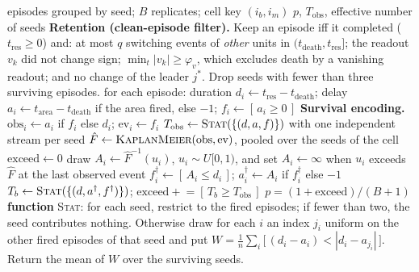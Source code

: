 \documentclass[11pt]{article}
\theoremstyle{definition}
\theoremstyle{remark}
\begin{document}
\begin{algorithm}[t]
\caption{Truncated calibrated null for the area-delay statistic.}
\label{alg:nulo}
\begin{algorithmic}[1]
\REQUIRE episodes grouped by seed; $B$ replicates; cell key $(i_b,i_m)$
\ENSURE $p$, $T_{\mathrm{obs}}$, effective number of seeds
\STATE \textbf{Retention (clean-episode filter).} Keep an episode iff it
completed ($t_{\mathrm{res}}\ge0$) and: at most $q$ switching events of
\emph{other} units in $(t_{\mathrm{death}},t_{\mathrm{res}}]$; the readout $v_k$
did not change sign; $\min_t|v_k|\ge\varphi_v$, which excludes death by a
vanishing readout; and no change of the leader $j^\ast$. Drop seeds with fewer
than three surviving episodes.
\STATE for each episode: duration $d_i\leftarrow t_{\mathrm{res}}-t_{\mathrm{death}}$;
       delay $a_i\leftarrow t_{\mathrm{area}}-t_{\mathrm{death}}$ if the area
       fired, else $-1$; \; $f_i\leftarrow[\,a_i\ge0\,]$
\STATE \textbf{Survival encoding.} $\mathrm{obs}_i\leftarrow a_i$ if $f_i$ else
       $d_i$; \; $\mathrm{ev}_i\leftarrow f_i$
\STATE $T_{\mathrm{obs}}\leftarrow\textsc{Stat}(\{(d,a,f)\})$ with one
       independent stream per seed
\STATE $\hat F\leftarrow\textsc{KaplanMeier}(\mathrm{obs},\mathrm{ev})$, pooled
       over the seeds of the cell
\STATE $\mathrm{exceed}\leftarrow0$
    \STATE draw $A_i\leftarrow\hat F^{-1}(u_i)$, $u_i\sim U[0,1)$, and set
           $A_i\leftarrow\infty$ when $u_i$ exceeds $\hat F$ at the last observed
           event 
    \STATE $f^\dagger_i\leftarrow[\,A_i\le d_i\,]$; \;
           $a^\dagger_i\leftarrow A_i$ if $f^\dagger_i$ else $-1$
  \ENDFOR
  \STATE $T_b\leftarrow\textsc{Stat}(\{(d,a^\dagger,f^\dagger)\})$; \;
         $\mathrm{exceed}\mathrel{+}=[\,T_b\ge T_{\mathrm{obs}}\,]$
\ENDFOR
\RETURN $p=(1+\mathrm{exceed})/(B+1)$
\medskip
\STATE \textbf{function} \textsc{Stat}: for each seed, restrict to the fired
episodes; if fewer than two, the seed contributes nothing. Otherwise draw for
each $i$ an index $j_i$ uniform on the other fired episodes of that seed and put
$W=\frac1n\sum_i\bigl[\,(d_i-a_i)<|d_i-a_{j_i}|\,\bigr]$. Return the mean of $W$
over the surviving seeds.
\end{algorithmic}
\end{algorithm}
\end{document}
